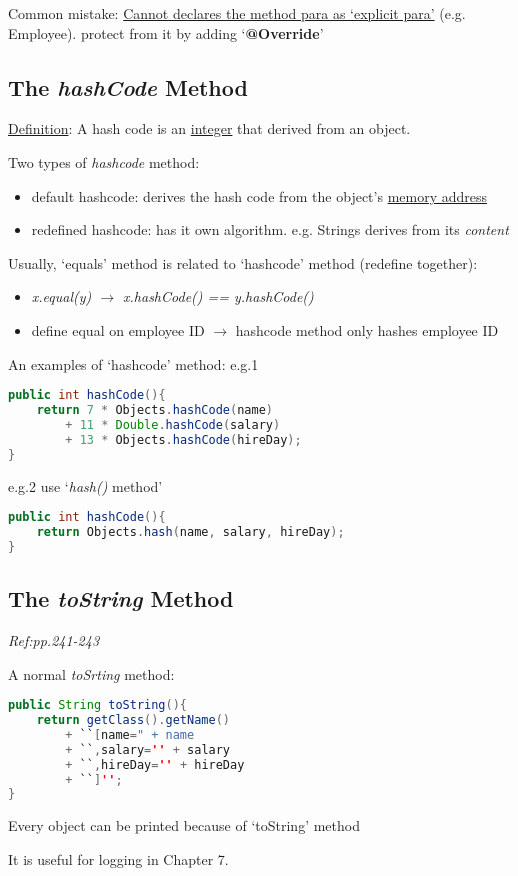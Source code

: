 \documentclass[12pt]{article}
\begin{document}
Common mistake: \underline{Cannot declares the method para as `explicit para'} (e.g. Employee).
protect from it by adding `\textbf{@Override}'

\subsection{The \emph{hashCode} Method}
\underline{Definition}: A hash code is an \underline{integer} that derived from an object.

Two types of \emph{hashcode} method:
\begin{itemize}
    \item default hashcode: derives the hash code from the object's \underline{memory address}
    \item redefined hashcode: has it own algorithm. e.g. Strings derives from its \emph{content}
\end{itemize}

Usually, `equals' method is related to `hashcode' method (redefine together):
\begin{itemize}
    \item \emph{x.equal(y) $\rightarrow$ x.hashCode() == y.hashCode()}
    \item define equal on employee ID $\rightarrow$ hashcode method only hashes employee ID
\end{itemize}

An examples of `hashcode' method:\newline
e.g.1
\begin{lstlisting}[language=Java]
public int hashCode(){
    return 7 * Objects.hashCode(name)
        + 11 * Double.hashCode(salary)
        + 13 * Objects.hashCode(hireDay);
}
\end{lstlisting} 

e.g.2 use `\emph{hash()} method'
\begin{lstlisting}[language=Java]
public int hashCode(){
    return Objects.hash(name, salary, hireDay);
}
\end{lstlisting}

\subsection{The \emph{toString} Method}
\emph{Ref:pp.241-243}

A normal \emph{toSrting} method:
\begin{lstlisting}[language=Java]
public String toString(){
    return getClass().getName()
        + ``[name=" + name
        + ``,salary='' + salary
        + ``,hireDay='' + hireDay
        + ``]'';
}
\end{lstlisting}


Every object can be printed because of `toString' method

It is useful for logging in Chapter 7.
\end{document}
